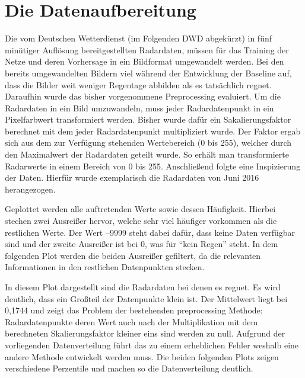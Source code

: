 \section{Die Datenaufbereitung}\label{die datenaufbereitung}
Die vom Deutschen Wetterdienst (im Folgenden DWD abgekürzt) in fünf minütiger Auflösung bereitgestellten Radardaten, müssen für das Training der Netze und deren Vorhersage in ein Bildformat umgewandelt werden.
Bei den bereits umgewandelten Bildern viel während der Entwicklung der Baseline auf, dass die Bilder weit weniger Regentage abbilden als es tatsächlich regnet. Daraufhin wurde das bisher vorgenommene Preprocessing evaluiert. Um die Radardaten in ein Bild umzuwandeln, muss jeder Radardatenpunkt in ein Pixelfarbwert transformiert werden. Bisher wurde dafür ein Sakalierungsfaktor berechnet mit dem jeder Radardatenpunkt multipliziert wurde. Der Faktor ergab sich aus dem zur Verfügung stehenden Wertebereich (0 bis 255), welcher durch den Maximalwert der Radardaten geteilt wurde. So erhält man transformierte Radarwerte in einem Bereich von 0 bis 255.
Anschließend folgte eine Inspizierung der Daten. Hierfür wurde exemplarisch die Radardaten von Juni 2016 herangezogen.

%  

Geplottet werden alle auftretenden Werte sowie dessen Häufigkeit. Hierbei stechen zwei Ausreißer hervor, welche sehr viel häufiger vorkommen als die restlichen Werte. Der Wert –9999 steht dabei dafür, dass keine Daten verfügbar sind und der zweite Ausreißer ist bei 0, was für “kein Regen” steht. In dem folgenden Plot werden die beiden Ausreißer gefiltert, da die relevanten Informationen in den restlichen Datenpunkten stecken.

%  

In diesem Plot dargestellt sind die Radardaten bei denen es regnet. Es wird deutlich, dass ein Großteil der Datenpunkte klein ist. Der Mittelwert liegt bei 0,1744 und zeigt das Problem der bestehenden preprocessing Methode: Radardatenpunkte deren Wert auch nach der Multiplikation mit dem berechneten Skalierungsfaktor kleiner eins sind werden zu null. Aufgrund der vorliegenden Datenverteilung führt das zu einem erheblichen Fehler weshalb eine andere Methode entwickelt werden muss.
Die beiden folgenden Plots zeigen verschiedene Perzentile und machen so die Datenverteilung deutlich.

